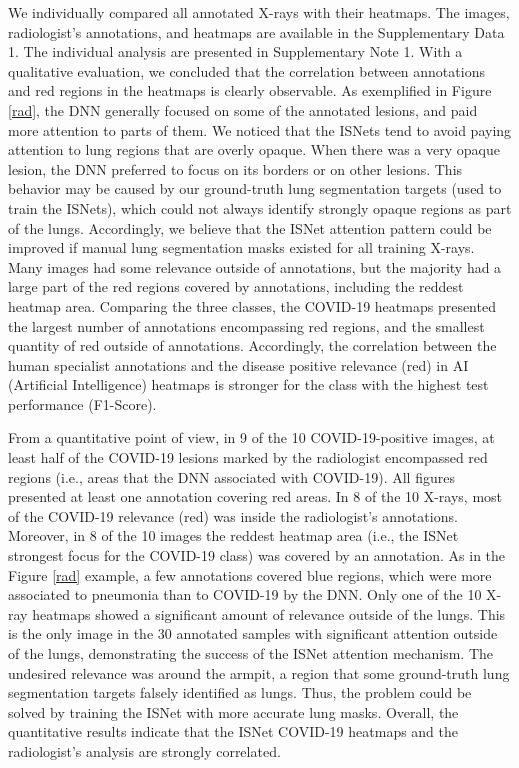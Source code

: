 \documentclass[fleqn,10pt]{wlscirep}
\begin{document}
{We individually compared all annotated X-rays with their heatmaps. The images, radiologist's annotations, and heatmaps are available in the Supplementary Data 1. The individual analysis are presented in Supplementary Note 1. With a qualitative evaluation, we concluded that the correlation between annotations and red regions in the heatmaps is clearly observable. As exemplified in Figure \ref{rad}, the DNN generally focused on some of the annotated lesions, and paid more attention to parts of them. We noticed that the ISNets tend to avoid paying attention to lung regions that are overly opaque. When there was a very opaque lesion, the DNN preferred to focus on its borders or on other lesions. This behavior may be caused by our ground-truth lung segmentation targets (used to train the ISNets), which could not always identify strongly opaque regions as part of the lungs. Accordingly, we believe that the ISNet attention pattern could be improved if manual lung segmentation masks existed for all training X-rays. Many images had some relevance outside of annotations, but the majority had a large part of the red regions covered by annotations, including the reddest heatmap area. Comparing the three classes, the COVID-19 heatmaps presented the largest number of annotations encompassing red regions, and the smallest quantity of red outside of annotations. Accordingly, the correlation between the human specialist annotations and the disease positive relevance (red) in AI (Artificial Intelligence) heatmaps is stronger for the class with the highest test performance (F1-Score).

From a quantitative point of view, in 9 of the 10 COVID-19-positive images, at least half of the COVID-19 lesions marked by the radiologist encompassed red regions (i.e., areas that the DNN associated with COVID-19). All figures presented at least one annotation covering red areas. In 8 of the 10 X-rays, most of the COVID-19 relevance (red) was inside the radiologist's annotations. Moreover, in 8 of the 10 images the reddest heatmap area (i.e., the ISNet strongest focus for the COVID-19 class) was covered by an annotation. As in the Figure \ref{rad} example, a few annotations covered blue regions, which were more associated to pneumonia than to COVID-19 by the DNN. Only one of the 10 X-ray heatmaps showed a significant amount of relevance outside of the lungs. This is the only image in the 30 annotated samples with significant attention outside of the lungs, demonstrating the success of the ISNet attention mechanism. The undesired relevance was around the armpit, a region that some ground-truth lung segmentation targets falsely identified as lungs. Thus, the problem could be solved by training the ISNet with more accurate lung masks. Overall, the quantitative results indicate that the ISNet COVID-19 heatmaps and the radiologist's analysis are strongly correlated.

}
\end{document}
